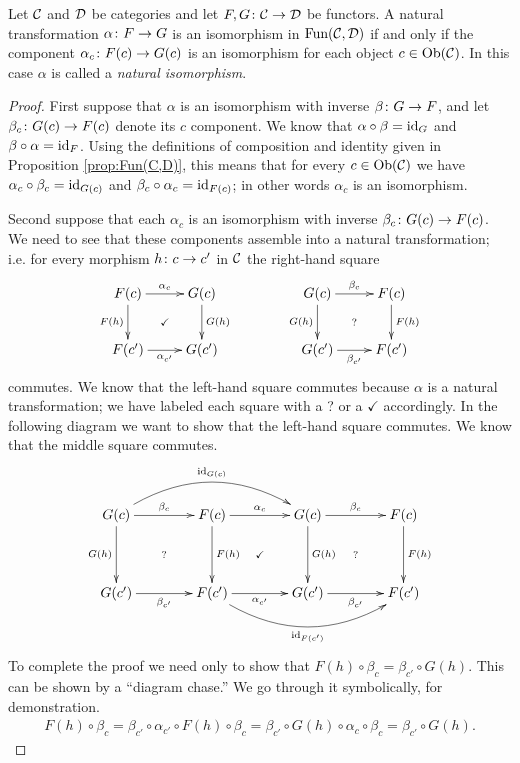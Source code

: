 \documentclass[CT4S-EN-RU]{subfiles}
\begin{document}
\begin{lemma}\label{lemma:natural iso}

Let $\mathcal{C}$ and $\mathcal{D}$ be categories and let $F,G\colon\mathcal{C}\rightarrow\mathcal{D}$ be functors. A natural transformation $\alpha\colon F\rightarrow G$ is an isomorphism in $\textnormal{Fun}(\mathcal{C},\mathcal{D})$ if and only if the component $\alpha_c\colon F(c)\rightarrow G(c)$ is an isomorphism for each object $c\in\textnormal{Ob}(\mathcal{C})$. In this case $\alpha$ is called a {\em natural isomorphism}.

\end{lemma}

\begin{proof}

First suppose that $\alpha$ is an isomorphism with inverse $\beta\colon G\rightarrow F$, and let $\beta_c\colon G(c)\rightarrow F(c)$ denote its $c$ component. We know that $\alpha\circ\beta=\textnormal{id}_G$ and $\beta\circ\alpha=\textnormal{id}_F$. Using the definitions of composition and identity given in Proposition \ref{prop:Fun(C,D)}, this means that for every $c\in\textnormal{Ob}(\mathcal{C})$ we have $\alpha_c\circ\beta_c=\textnormal{id}_{G(c)}$ and $\beta_c\circ\alpha_c=\textnormal{id}_{F(c)}$; in other words $\alpha_c$ is an isomorphism.

Second suppose that each $\alpha_c$ is an isomorphism with inverse $\beta_c\colon G(c)\rightarrow F(c)$. We need to see that these components assemble into a natural transformation; i.e. for every morphism $h\colon c\rightarrow c'$ in $\mathcal{C}$ the right-hand square 
$$
\xymatrix{F(c)\ar@{}[dr]|{\checkmark}\ar[d]_{F(h)}\ar[r]^{\alpha_c}&G(c)\ar[d]^{G(h)}\\F(c')\ar[r]_{\alpha_{c'}}&G(c')}\hspace{.5in}
\xymatrix{G(c)\ar@{}[dr]|{?}\ar[d]_{G(h)}\ar[r]^{\beta_c}&F(c)\ar[d]^{F(h)}\\G(c')\ar[r]_{\beta_{c'}}&F(c')}
$$
commutes. We know that the left-hand square commutes because $\alpha$ is a natural transformation; we have labeled each square with a ? or a $\checkmark$ accordingly. In the following diagram we want to show that the left-hand square commutes. We know that the middle square commutes.
$$
\xymatrix@=40pt{G(c)\ar@/^2pc/[rr]^{\id_{G(c)}}\ar@{}[dr]|{?}\ar[d]_{G(h)}\ar[r]^{\beta_c}&F(c)\ar@{}[dr]|{\checkmark}\ar[d]^{F(h)}\ar[r]^{\alpha_c}&G(c)\ar@{}[dr]|{?}\ar[d]^{G(h)}\ar[r]^{\beta_c}&F(c)\ar[d]^{F(h)}\\
G(c')\ar[r]_{\beta_{c'}}&F(c')\ar[r]_{\alpha_{c'}}\ar@/_2pc/[rr]_{\id_{F(c')}}&G(c')\ar[r]_{\beta_{c'}}&F(c')}
$$
To complete the proof we need only to show that $F(h)\circ\beta_c=\beta_{c'}\circ G(h)$. This can be shown by a “diagram chase.” We go through it symbolically, for demonstration.
\begin{align*}
F(h)\circ\beta_c=\beta_{c'}\circ\alpha_{c'}\circ F(h)\circ\beta_c=\beta_{c'}\circ G(h)\circ\alpha_c\circ\beta_c=\beta_{c'}\circ G(h).
\end{align*}

\end{proof}
\end{document}
